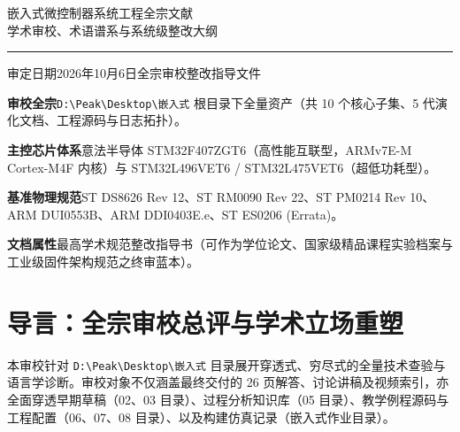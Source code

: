 \documentclass[11pt,a4paper]{ctexart}
\begin{document}
\thispagestyle{plain}
\begin{center}
  {\heiti\color{accent}嵌入式微控制器系统工程全宗文献\\[4pt]学术审校、术语谱系与系统级整改大纲\par}
  \vspace{8pt}
  {\color{accent!55}\rule{0.32\textwidth}{1pt}}\par
  \vspace{6pt}
  {\small 审定日期\quad 2026年10月6日\quad 全宗审校整改指导文件\par}
\end{center}
\vspace{4pt}

\begin{metabox}
{\bfseries\heiti 审校全宗}\quad \texttt{D:\textbackslash Peak\textbackslash Desktop\textbackslash 嵌入式} 根目录下全量资产（共 10 个核心子集、5 代演化文档、工程源码与日志拓扑）。

{\bfseries\heiti 主控芯片体系}\quad 意法半导体 STM32F407ZGT6（高性能互联型，ARMv7E-M Cortex-M4F 内核）与 STM32L496VET6 / STM32L475VET6（超低功耗型）。

{\bfseries\heiti 基准物理规范}\quad ST DS8626 Rev 12、ST RM0090 Rev 22、ST PM0214 Rev 10、ARM DUI0553B、ARM DDI0403E.e、ST ES0206 (Errata)。

{\bfseries\heiti 文档属性}\quad 最高学术规范整改指导书（可作为学位论文、国家级精品课程实验档案与工业级固件架构规范之终审蓝本）。
\end{metabox}

\section*{导言：全宗审校总评与学术立场重塑}
本审校针对 \texttt{D:\textbackslash Peak\textbackslash Desktop\textbackslash 嵌入式} 目录展开穿透式、穷尽式的全量技术查验与语言学诊断。审校对象不仅涵盖最终交付的 26 页解答、讨论讲稿及视频索引，亦全面穿透早期草稿（02、03 目录）、过程分析知识库（05 目录）、教学例程源码与工程配置（06、07、08 目录）、以及构建仿真记录（嵌入式作业目录）。
\end{document}
